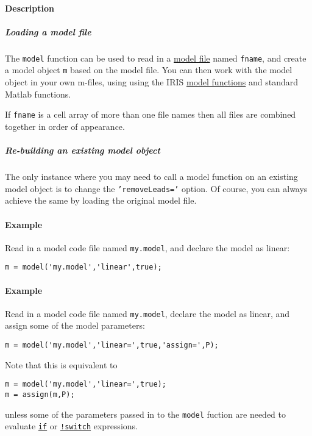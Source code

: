 \paragraph{Description}

\subparagraph{Loading a model file}

The \texttt{model} function can be used to read in a
\href{modellang/Contents}{model file} named \texttt{fname}, and create a
model object \texttt{m} based on the model file. You can then work with
the model object in your own m-files, using using the IRIS
\href{model/Contents}{model functions} and standard Matlab functions.

If \texttt{fname} is a cell array of more than one file names then all
files are combined together in order of appearance.

\subparagraph{Re-building an existing model
object}

The only instance where you may need to call a model function on an
existing model object is to change the \texttt{'removeLeads='} option.
Of course, you can always achieve the same by loading the original model
file.

\paragraph{Example}

Read in a model code file named \texttt{my.model}, and declare the model
as linear:

\begin{verbatim}
m = model('my.model','linear',true);
\end{verbatim}

\paragraph{Example}

Read in a model code file named \texttt{my.model}, declare the model as
linear, and assign some of the model parameters:

\begin{verbatim}
m = model('my.model','linear=',true,'assign=',P);
\end{verbatim}

Note that this is equivalent to

\begin{verbatim}
m = model('my.model','linear=',true);
m = assign(m,P);
\end{verbatim}

unless some of the parameters passed in to the \texttt{model} fuction
are needed to evaluate \href{modellang/if}{\texttt{if}} or
\href{modellang/switch}{\texttt{!switch}} expressions.


